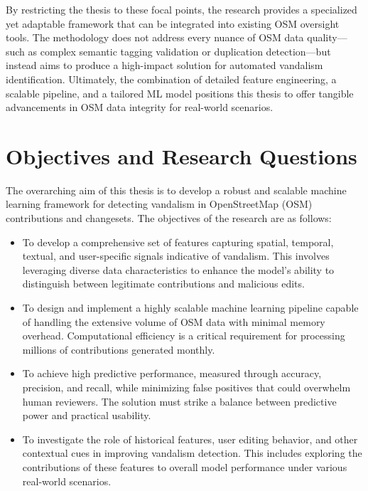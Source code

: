 \documentclass[
    13pt, %
    a4paper, %
    twoside, 
    DIV14, %
    listof=totoc, %
    bibliography=totoc, %
    index=totoc, %
    headsepline
]{scrreprt}
\begin{document}
By restricting the thesis to these focal points, the research provides a specialized yet adaptable framework that can be integrated into existing OSM oversight tools. The methodology does not address every nuance of OSM data quality—such as complex semantic tagging validation or duplication detection—but instead aims to produce a high-impact solution for automated vandalism identification. Ultimately, the combination of detailed feature engineering, a scalable pipeline, and a tailored ML model positions this thesis to offer tangible advancements in OSM data integrity for real-world scenarios.


\section{Objectives and Research Questions}

The overarching aim of this thesis is to develop a robust and scalable machine learning framework for detecting vandalism in OpenStreetMap (OSM) contributions and changesets. The objectives of the research are as follows:

\begin{itemize}
  \item To develop a comprehensive set of features capturing spatial, temporal, textual, and user-specific signals indicative of vandalism. This involves leveraging diverse data characteristics to enhance the model’s ability to distinguish between legitimate contributions and malicious edits.

  \item To design and implement a highly scalable machine learning pipeline capable of handling the extensive volume of OSM data with minimal memory overhead. Computational efficiency is a critical requirement for processing millions of contributions generated monthly.

  \item To achieve high predictive performance, measured through accuracy, precision, and recall, while minimizing false positives that could overwhelm human reviewers. The solution must strike a balance between predictive power and practical usability.

  \item  To investigate the role of historical features, user editing behavior, and other contextual cues in improving vandalism detection. This includes exploring the contributions of these features to overall model performance under various real-world scenarios.
\end{itemize}
\end{document}
